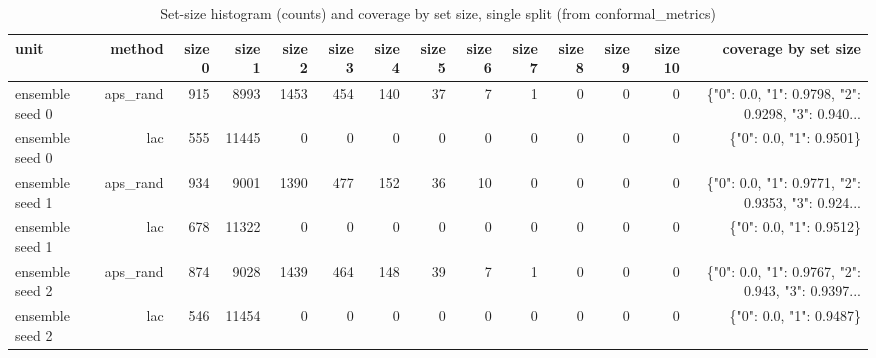 \begin{table}
\centering
\caption{Set-size histogram (counts) and coverage by set size, single split (from conformal_metrics)}
\label{tab:de_conformal_setsize_hist}
\begin{tabular}{lrrrrrrrrrrrrr}
\toprule
           unit &   method &  size 0 &  size 1 &  size 2 &  size 3 &  size 4 &  size 5 &  size 6 &  size 7 &  size 8 &  size 9 &  size 10 &                               coverage by set size \\
\midrule
ensemble seed 0 & aps\_rand &     915 &    8993 &    1453 &     454 &     140 &      37 &       7 &       1 &       0 &       0 &        0 & \{"0": 0.0, "1": 0.9798, "2": 0.9298, "3": 0.940... \\
ensemble seed 0 &      lac &     555 &   11445 &       0 &       0 &       0 &       0 &       0 &       0 &       0 &       0 &        0 &                            \{"0": 0.0, "1": 0.9501\} \\
ensemble seed 1 & aps\_rand &     934 &    9001 &    1390 &     477 &     152 &      36 &      10 &       0 &       0 &       0 &        0 & \{"0": 0.0, "1": 0.9771, "2": 0.9353, "3": 0.924... \\
ensemble seed 1 &      lac &     678 &   11322 &       0 &       0 &       0 &       0 &       0 &       0 &       0 &       0 &        0 &                            \{"0": 0.0, "1": 0.9512\} \\
ensemble seed 2 & aps\_rand &     874 &    9028 &    1439 &     464 &     148 &      39 &       7 &       1 &       0 &       0 &        0 & \{"0": 0.0, "1": 0.9767, "2": 0.943, "3": 0.9397... \\
ensemble seed 2 &      lac &     546 &   11454 &       0 &       0 &       0 &       0 &       0 &       0 &       0 &       0 &        0 &                            \{"0": 0.0, "1": 0.9487\} \\
\bottomrule
\end{tabular}
\end{table}
